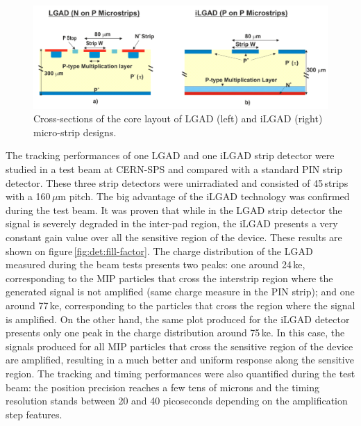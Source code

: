 \begin{figure}[!htbp]
\centering
\includegraphics[width=1.0\hsize]{Detector/fig/cross-section.png}
\caption{Cross-sections of the core layout of LGAD (left) and iLGAD (right) micro-strip designs.}
\label{fig:det:cross-section}
\end{figure}

The tracking performances of one LGAD and one iLGAD strip detector were studied in a test beam at CERN-SPS and compared with a standard PIN strip detector. These three strip detectors were unirradiated and consisted of 45\,strips with a 160\,$\mu$m pitch. 
The big advantage of the iLGAD technology was confirmed during the test beam. It was proven that while in the LGAD strip detector the signal is severely degraded in the inter-pad region, the iLGAD presents a very constant gain value over all the sensitive region of the device. These results are shown on figure\,\ref{fig:det:fill-factor}. The charge distribution of the LGAD measured during the beam tests presents two peaks: one around 24\,ke, corresponding to the MIP particles that cross the interstrip region where the generated signal is not amplified (same charge measure in the PIN strip); and one around 77\,ke, corresponding to the particles that cross the region where the signal is amplified. On the other hand, the same plot produced for the iLGAD detector presents only one peak in the charge distribution around 75\,ke. In this case,  the signals produced for all MIP particles that cross the sensitive region of the device are amplified, resulting in a much better and uniform response along the sensitive region. The tracking and timing performances were also quantified during the test beam: the position precision reaches a few tens of microns and the timing resolution stands between 20 and 40 picoseconds depending on the amplification step features.


